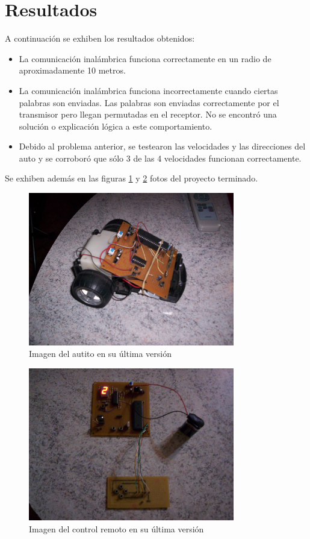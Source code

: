 \documentclass[a4paper,10pt]{article}
\begin{document}
	\section{Resultados}
		A continuación se exhiben los resultados obtenidos:
		\begin{itemize}
			\item La comunicación inalámbrica funciona correctamente en un radio de aproximadamente 10 metros.
			\item La comunicación inalámbrica funciona incorrectamente cuando ciertas palabras son enviadas. Las palabras son enviadas correctamente por el 
			transmisor pero llegan permutadas en el receptor. No se encontró una solución o explicación lógica a este comportamiento.
			\item Debido al problema anterior, se testearon las velocidades y las direcciones del auto y se corroboró que sólo 3 de las 4 velocidades funcionan
			correctamente.
		\end{itemize}

		Se exhiben además en las figuras \ref{timg004} y \ref{timg005} fotos del proyecto terminado.

		\begin{figure}[!htb]
			\centering
			\includegraphics[width=9cm]{Imagenes/ImgAutito.jpg}
			\caption{Imagen del autito en su última versión} \label{timg004}
		\end{figure}

		\begin{figure}[!htb]
			\centering
			\includegraphics[width=9cm]{Imagenes/ImgControl.jpg}
			\caption{Imagen del control remoto en su última versión} \label{timg005}
		\end{figure}
\end{document}
